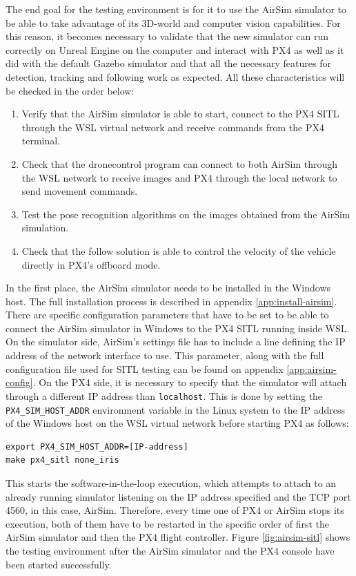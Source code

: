 The end goal for the testing environment is for it to use the AirSim simulator to be able to take advantage of its 3D-world and computer vision capabilities.
For this reason, it becomes necessary to validate that the new simulator can run correctly on Unreal Engine on the computer and interact with PX4 as well as it did with the default Gazebo simulator and that all the necessary features for detection, tracking and following work as expected.
All these characteristics will be checked in the order below:
\begin{enumerate}
    \item Verify that the AirSim simulator is able to start, connect to the PX4 SITL through the WSL virtual network and receive commands from the PX4 terminal.
    \item Check that the dronecontrol program can connect to both AirSim through the WSL network to receive images and PX4 through the local network to send movement commands.
    \item Test the pose recognition algorithms on the images obtained from the AirSim simulation.
    \item Check that the follow solution is able to control the velocity of the vehicle directly in PX4's offboard mode.
\end{enumerate}

In the first place, the AirSim simulator needs to be installed in the Windows host.
The full installation process is described in appendix \ref{app:install-airsim}.
There are specific configuration parameters that have to be set to be able to connect the AirSim simulator in Windows to the PX4 SITL running inside WSL.
On the simulator side, AirSim's settings file has to include a line defining the IP address of the network interface to use.
This parameter, along with the full configuration file used for SITL testing can be found on appendix \ref{app:airsim-config}.
On the PX4 side, it is necessary to specify that the simulator will attach through a different IP address than \texttt{localhost}.
This is done by setting the \texttt{PX4\_SIM\_HOST\_ADDR} environment variable in the Linux system to the IP address of the Windows host on the WSL virtual network before starting PX4 as follows:
\begin{verbatim}
export PX4_SIM_HOST_ADDR=[IP-address]
make px4_sitl none_iris
\end{verbatim}
This starts the software-in-the-loop execution, which attempts to attach to an already running simulator listening on the IP address specified and the TCP port 4560, in this case, AirSim.
Therefore, every time one of PX4 or AirSim stops its execution, both of them have to be restarted in the specific order of first the AirSim simulator and then the PX4 flight controller.
Figure \ref{fig:airsim-sitl} shows the testing environment after the AirSim simulator and the PX4 console have been started successfully.

